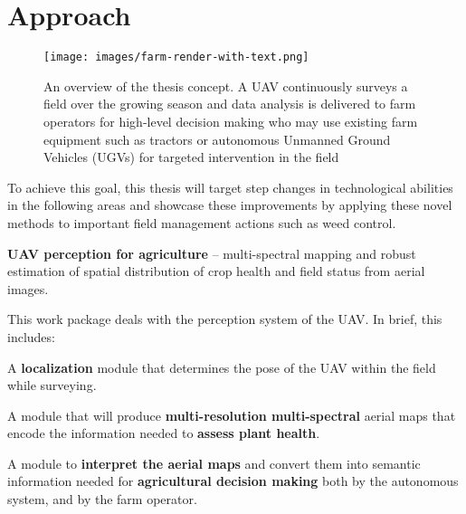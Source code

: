 \section{Approach}
\label{sec:Approach}

\begin{figure}[h]
   \centering
    \texttt{[image: images/farm-render-with-text.png]}
    \caption{An overview of the thesis concept. A UAV continuously surveys a field over the growing season and data analysis is delivered to farm operators for high-level decision making who may use existing farm equipment such as tractors or autonomous Unmanned Ground Vehicles (UGVs) for targeted intervention in the field}
    \label{fig:concept-overview}
\end{figure}

To achieve this goal, this thesis will target step changes in technological abilities in the following areas and showcase these improvements by applying these novel methods to important field management actions such as weed control.
\begin{denseItemize}
\item {\bf UAV perception for agriculture} -- multi-spectral mapping and robust estimation of spatial distribution of crop health and field status from aerial images.
\end{denseItemize}

This work package deals with the perception system of the UAV. In brief, this includes:
\begin{denseItemize}
\item A {\bf localization} module that determines the pose of the UAV within the field while surveying.
\item A module that will produce {\bf multi-resolution multi-spectral} aerial maps that encode the information needed to {\bf assess plant health}.
\item A module to {\bf interpret the aerial maps} and convert them into semantic information needed for {\bf agricultural decision making} both by the autonomous system, and by the farm operator.
\end{denseItemize}

